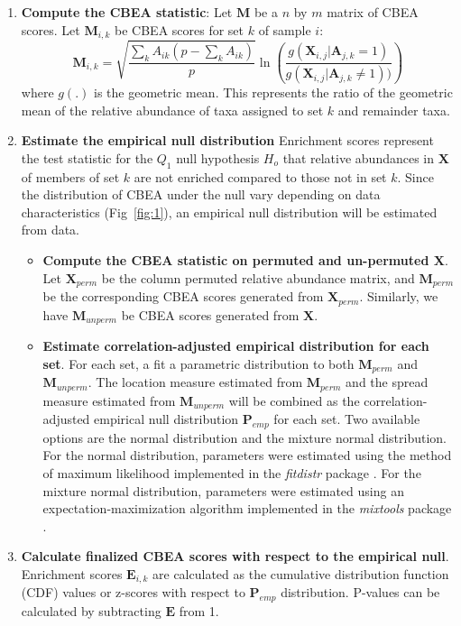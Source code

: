 \documentclass[10pt,letterpaper]{article}
\begin{document}
\begin{enumerate}
    \item \textbf{Compute the CBEA statistic}: Let $\mathbf{M}$ be a $n$ by $m$ matrix of CBEA scores. Let $\mathbf{M}_{i,k}$ be CBEA scores for set $k$ of sample $i$:   
    \begin{equation}\label{main_eq}
        \mathbf{M}_{i,k} = \sqrt{\frac{\sum_k A_{ik}(p - \sum_k A_{ik})}{p}} \ln \left( \frac{g(\mathbf{X}_{i,j}|\mathbf{A}_{j,k} = 1)}{g(\mathbf{X}_{i,j}|\mathbf{A}_{j,k} \neq 1))} \right)
    \end{equation}
    where $g(.)$ is the geometric mean. This represents the ratio of the geometric mean of the relative abundance of taxa assigned to set $k$ and remainder taxa. 
    \item \textbf{Estimate the empirical null distribution} Enrichment scores represent the test statistic for the $Q_1$ null hypothesis $H_o$ that relative abundances in $\mathbf{X}$ of members of set $k$ are not enriched compared to those not in set $k$. Since the distribution of CBEA under the null vary depending on data characteristics (Fig~\ref{fig:1}), an empirical null distribution will be estimated from data.
    \begin{itemize}
        \item \textbf{Compute the CBEA statistic on permuted and un-permuted $\mathbf{X}$}.  Let $\mathbf{X}_{perm}$ be the column permuted relative abundance matrix, and $\mathbf{M}_{perm}$ be the corresponding CBEA scores generated from $\mathbf{X}_{perm}$. Similarly, we have $\mathbf{M}_{unperm}$ be CBEA scores generated from $\mathbf{X}$.
        \item \textbf{Estimate correlation-adjusted empirical distribution for each set}. For each set, a fit a parametric distribution to both $\mathbf{M}_{perm}$ and $\mathbf{M}_{unperm}$. The location measure estimated from $\mathbf{M}_{perm}$ and the spread measure estimated from $\mathbf{M}_{unperm}$ will be combined as the correlation-adjusted empirical null distribution $\mathbf{P}_{emp}$ for each set. Two available options are the normal distribution and the mixture normal distribution. For the normal distribution, parameters were estimated using the method of maximum likelihood implemented in the \emph{fitdistr} package \cite{delignette-muller2015}. For the mixture normal distribution, parameters were estimated using an expectation-maximization algorithm implemented in the \emph{mixtools} package \cite{benaglia2009}. 
    \end{itemize}
    \item \textbf{Calculate finalized CBEA scores with respect to the empirical null}. Enrichment scores $\mathbf{E}_{i,k}$ are calculated as the cumulative distribution function (CDF) values or z-scores with respect to $\mathbf{P}_{emp}$ distribution. P-values can be calculated by subtracting $\mathbf{E}$ from 1. 
\end{enumerate}
\end{document}
